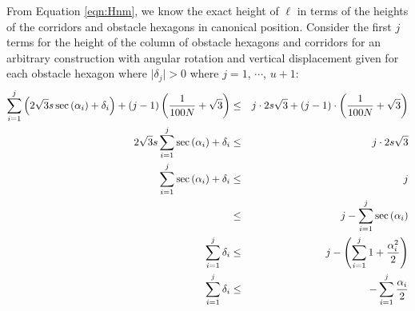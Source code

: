 From Equation \ref{eqn:Hnm}, we know the exact height of $\ell$ in terms of the heights of the corridors and obstacle hexagons in canonical position.
Consider the first $j$ terms for the height of the column of obstacle hexagons and corridors for an arbitrary construction with angular rotation and vertical displacement given for each obstacle hexagon where $\vert \delta_j \vert > 0$ where $j = 1$, $\cdots$, $u+1$:
\begin{eqnarray*}
\sum_{i=1}^j \left( 2 \sqrt{3} s \sec \left(  \alpha_i \right) + \delta_i  \right) + (j-1) \left( \frac{1}{100N}+\sqrt{3} \right) &\leq& j \cdot 2 s \sqrt{3} + (j-1) \cdot \left( \frac{1}{100N}+\sqrt{3} \right)\\
2 \sqrt{3} s \sum_{i=1}^j \sec \left( \alpha_i \right) + \delta_i &\leq& j \cdot 2 s \sqrt{3}  \\
\sum_{i=1}^j \sec \left( \alpha_i \right) + \delta_i &\leq& j\\
 &\leq& j- \sum_{i=1}^j \sec \left( \alpha_i \right)\\
 \sum_{i=1}^j \delta_i &\leq& j- \left( \sum_{i=1}^j 1 + \frac{\alpha_i^2}{2} \right)\\
  \sum_{i=1}^j \delta_i &\leq& - \sum_{i=1}^j \frac{\alpha_i}{2}
\end{eqnarray*}

